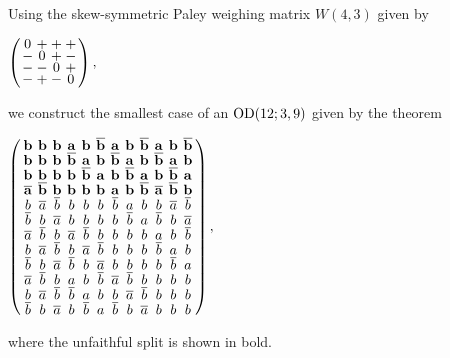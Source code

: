 \documentclass[../../../main]{subfiles}
\begin{document}
\begin{ex}
 Using the skew-symmetric Paley weighing matrix  $W(4,3)$ given by
 \begin{defenum}
  \item $
  \arraycolsep=1.25pt\def\arraystretch{0.625}
  \left(\begin{array}{cccc}
  0&+&+&+\\
  -&0&+&-\\
  -&-&0&+\\
  -&+&-&0
  \end{array}\right),
  $
 \end{defenum}
 we construct the smallest case of an $\text{OD}(12; 3, 9)$ given by the theorem
 \begin{defenum}[resume]
  \item $
  \arraycolsep=2.0pt\def\arraystretch{0.5}
  \left(\begin{array}{cccccccccccc}
   \mathbf{b} & \mathbf{b} & \mathbf{b} & \mathbf{a} & \mathbf{b} & \mathbf{\bar b} & \mathbf{a} & \mathbf{b} & \mathbf{\bar b} & \mathbf{a} & \mathbf{b} & \mathbf{\bar b} \\
\mathbf{b} & \mathbf{b} & \mathbf{b} & \mathbf{\bar b} & \mathbf{a} & \mathbf{b} & \mathbf{\bar b} & \mathbf{a} & \mathbf{b} & \mathbf{\bar b} & \mathbf{a} & \mathbf{b} \\
\mathbf{b} & \mathbf{b} & \mathbf{b} & \mathbf{b} & \mathbf{\bar b} & \mathbf{a} & \mathbf{b} & \mathbf{\bar b} & \mathbf{a} & \mathbf{b} & \mathbf{\bar b} & \mathbf{a} \\
\mathbf{\bar a} & \mathbf{\bar b} & \mathbf{b} & \mathbf{b} & \mathbf{b} & \mathbf{b} & \mathbf{a} & \mathbf{b} & \mathbf{\bar b} & \mathbf{\bar a} & \mathbf{\bar b} & \mathbf{b} \\
b & \bar a & \bar b & b & b & b & \bar b & a & b & b & \bar a & \bar b \\
\bar b & b & \bar a & b & b & b & b & \bar b & a & \bar b & b & \bar a \\
\bar a & \bar b & b & \bar a & \bar b & b & b & b & b & a & b & \bar b \\
b & \bar a & \bar b & b & \bar a & \bar b & b & b & b & \bar b & a & b \\
\bar b & b & \bar a & \bar b & b & \bar a & b & b & b & b & \bar b & a \\
\bar a & \bar b & b & a & b & \bar b & \bar a & \bar b & b & b & b & b \\
b & \bar a & \bar b & \bar b & a & b & b & \bar a & \bar b & b & b & b \\
\bar b & b & \bar a & b & \bar b & a & \bar b & b & \bar a & b & b & b \\
  \end{array}\right),
  $
 \end{defenum}
 where the unfaithful split is shown in bold.
\end{ex}
\end{document}
